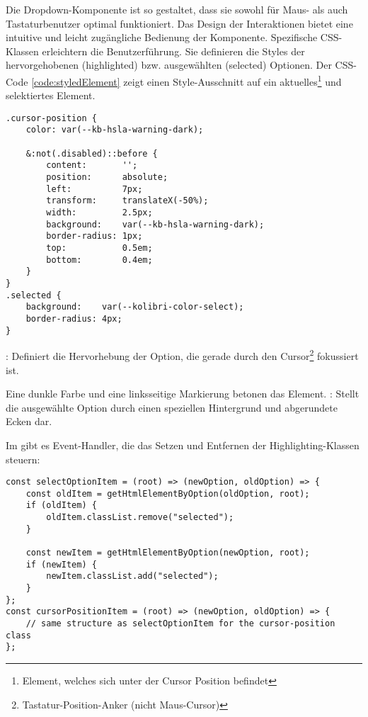 Die Dropdown-Komponente ist so gestaltet, dass sie sowohl für Maus- als auch Tastaturbenutzer optimal funktioniert. 
Das Design der Interaktionen bietet eine intuitive und leicht zugängliche Bedienung der Komponente.
Spezifische CSS-Klassen erleichtern die Benutzerführung.
Sie definieren die Styles der hervorgehobenen (highlighted) bzw. ausgewählten (selected) Optionen.
Der CSS-Code \ref{code:styledElement} zeigt einen Style-Ausschnitt auf ein aktuelles\footnote{
    Element, welches sich unter der Cursor Position befindet
} und selektiertes Element.

\begin{lstlisting}[style = htmlcssjs, caption = Aktuelle (\codestyle{cursor-position}) und ausgewählte (\codestyle{selected}) Option, label = code:styledElement]
.cursor-position {
    color: var(--kb-hsla-warning-dark);

    &:not(.disabled)::before {
        content:       '';
        position:      absolute;
        left:          7px;
        transform:     translateX(-50%);
        width:         2.5px;
        background:    var(--kb-hsla-warning-dark);
        border-radius: 1px;
        top:           0.5em;
        bottom:        0.4em;
    }
}
.selected {
    background:    var(--kolibri-color-select);
    border-radius: 4px;
}
\end{lstlisting}

: Definiert die Hervorhebung der Option, die gerade durch den Cursor\footnote{
    Tastatur-Position-Anker (nicht Maus-Cursor)
} fokussiert ist.

Eine dunkle Farbe und eine linksseitige Markierung betonen das Element.
: Stellt die ausgewählte Option durch einen speziellen Hintergrund und abgerundete Ecken dar.

Im  gibt es Event-Handler, die das Setzen und Entfernen der Highlighting-Klassen steuern:

\begin{lstlisting}[style = htmlcssjs, caption = Steuerung der Highlighting-Klassen, label = code:highlightChange]
const selectOptionItem = (root) => (newOption, oldOption) => {
    const oldItem = getHtmlElementByOption(oldOption, root);
    if (oldItem) {
        oldItem.classList.remove("selected");
    }

    const newItem = getHtmlElementByOption(newOption, root);
    if (newItem) {
        newItem.classList.add("selected");
    }
}; 
const cursorPositionItem = (root) => (newOption, oldOption) => {
    // same structure as selectOptionItem for the cursor-position class
}; 
\end{lstlisting}

